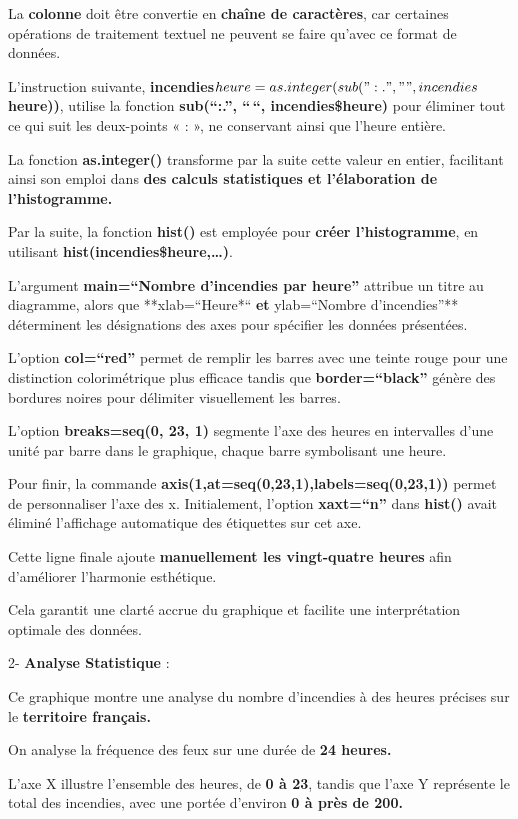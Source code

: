 \documentclass[
]{article}
\begin{document}
La \textbf{colonne} doit être convertie en \textbf{chaîne de
caractères}, car certaines opérations de traitement textuel ne peuvent
se faire qu'avec ce format de données.

L'instruction suivante,
\textbf{incendies\(heure = as.integer(sub(":.", "", incendies\)heure))},
utilise la fonction \textbf{sub(``:.'', ``\,``, incendies\$heure)} pour
éliminer tout ce qui suit les deux-points « : », ne conservant ainsi que
l'heure entière.

La fonction \textbf{as.integer()} transforme par la suite cette valeur
en entier, facilitant ainsi son emploi dans \textbf{des calculs
statistiques et l'élaboration de l'histogramme.}

Par la suite, la fonction \textbf{hist()} est employée pour
\textbf{créer l'histogramme}, en utilisant
\textbf{hist(incendies\$heure,\ldots)}.

L'argument \textbf{main=``Nombre d'incendies par heure''} attribue un
titre au diagramme, alors que **xlab=``Heure*``\textbf{ et
}ylab=``Nombre d'incendies''** déterminent les désignations des axes
pour spécifier les données présentées.

L'option \textbf{col=``red''} permet de remplir les barres avec une
teinte rouge pour une distinction colorimétrique plus efficace tandis
que \textbf{border=``black''} génère des bordures noires pour délimiter
visuellement les barres.

L'option \textbf{breaks=seq(0, 23, 1)} segmente l'axe des heures en
intervalles d'une unité par barre dans le graphique, chaque barre
symbolisant une heure.

Pour finir, la commande
\textbf{axis(1,at=seq(0,23,1),labels=seq(0,23,1))} permet de
personnaliser l'axe des x. Initialement, l'option \textbf{xaxt=``n''}
dans \textbf{hist()} avait éliminé l'affichage automatique des
étiquettes sur cet axe.

Cette ligne finale ajoute \textbf{manuellement les vingt-quatre heures}
afin d'améliorer l'harmonie esthétique.

Cela garantit une clarté accrue du graphique et facilite une
interprétation optimale des données.

2- \textbf{Analyse Statistique} :

Ce graphique montre une analyse du nombre d'incendies à des heures
précises sur le \textbf{territoire français.}

On analyse la fréquence des feux sur une durée de \textbf{24 heures.}

L'axe X illustre l'ensemble des heures, de \textbf{0 à 23}, tandis que
l'axe Y représente le total des incendies, avec une portée d'environ
\textbf{0 à près de 200.}
\end{document}

